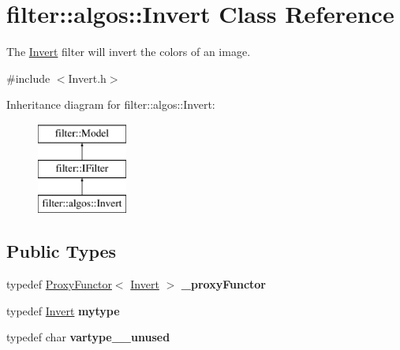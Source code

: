 \hypertarget{classfilter_1_1algos_1_1_invert}{}\section{filter\+:\+:algos\+:\+:Invert Class Reference}
\label{classfilter_1_1algos_1_1_invert}


The \hyperlink{classfilter_1_1algos_1_1_invert}{Invert} filter will invert the colors of an image.  




{\ttfamily \#include $<$Invert.\+h$>$}

Inheritance diagram for filter\+:\+:algos\+:\+:Invert\+:\begin{figure}[H]
\begin{center}
\leavevmode
\includegraphics[height=3.000000cm]{d5/d93/classfilter_1_1algos_1_1_invert}
\end{center}
\end{figure}
\subsection*{Public Types}
\begin{DoxyCompactItemize}
\item 
\mbox{\label{classfilter_1_1algos_1_1_invert_ad4bfea474f67af264fa18ac0c360fdbf}} 
typedef \hyperlink{class_proxy_functor}{Proxy\+Functor}$<$ \hyperlink{classfilter_1_1algos_1_1_invert}{Invert} $>$ {\bfseries \+\_\+proxy\+Functor}
\item 
\mbox{\label{classfilter_1_1algos_1_1_invert_aaeb1c627d08a1e5e6cdbcefc108ec4dc}} 
typedef \hyperlink{classfilter_1_1algos_1_1_invert}{Invert} {\bfseries mytype}
\item 
\mbox{\label{classfilter_1_1algos_1_1_invert_acc0c44d84876a788db4f9704b99649b4}} 
typedef char {\bfseries vartype\+\_\+\+\_\+unused}
\end{DoxyCompactItemize}
